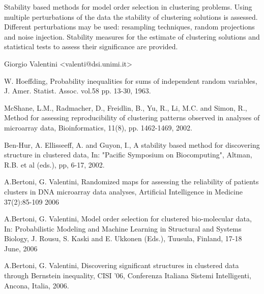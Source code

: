 \documentclass{article}
\begin{document}
\begin{Description}\relax
Stability based methods for model order selection in clustering problems. 
Using multiple perturbations of the data the stability of clustering solutions is assessed. Different
perturbations may be used: resampling techniques, random projections and noise injection. Stability measures
for the estimate of clustering solutions and statistical tests to assess their significance are provided.
\end{Description}
\begin{Details}\relax
{}
\end{Details}
\begin{Author}\relax
Giorgio Valentini <valenti@dsi.unimi.it>
\end{Author}
\begin{References}\relax
W. Hoeffding, Probability inequalities for sums of independent random variables, J. Amer. Statist. Assoc. vol.58 pp. 13-30, 1963.

McShane, L.M., Radmacher, D., Freidlin, B., Yu, R.,  Li, M.C. and Simon, R.,
Method for assessing reproducibility of clustering patterns observed in analyses of microarray data,
Bioinformatics, 11(8), pp. 1462-1469, 2002.

Ben-Hur, A. Ellisseeff, A. and Guyon, I., A stability based method for discovering structure in clustered data,
In: "Pacific Symposium on Biocomputing", Altman, R.B. et al (eds.), pp, 6-17, 2002.

A.Bertoni, G. Valentini, Randomized maps for assessing the reliability of patients clusters in DNA microarray data analyses, 
Artificial Intelligence in Medicine 37(2):85-109  2006

A.Bertoni, G. Valentini, Model order selection for clustered bio-molecular data,  
In: Probabilistic Modeling and Machine Learning in Structural and Systems Biology, J. Rousu, S. Kaski and E. Ukkonen (Eds.), 
Tuusula, Finland, 17-18 June,  2006

A.Bertoni, G. Valentini, Discovering significant structures in clustered data through Bernstein inequality, 
CISI '06, Conferenza Italiana Sistemi Intelligenti, Ancona, Italia, 2006.
\end{References}
\begin{SeeAlso}\relax
{}
\end{SeeAlso}
\end{document}
